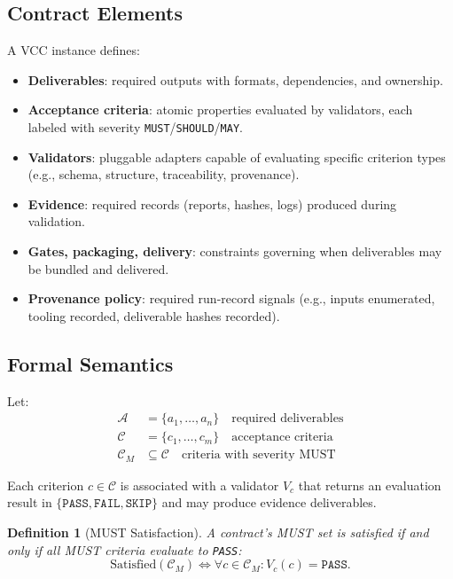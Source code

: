 \documentclass[11pt]{article}
\newtheorem{definition}{Definition}
\begin{document}
\subsection{Contract Elements}
A VCC instance defines:
\begin{itemize}[leftmargin=*]
  \item \textbf{Deliverables}: required outputs with formats, dependencies, and ownership.
  \item \textbf{Acceptance criteria}: atomic properties evaluated by validators, each labeled with severity \texttt{MUST}/\texttt{SHOULD}/\texttt{MAY}.
  \item \textbf{Validators}: pluggable adapters capable of evaluating specific criterion types (e.g., schema, structure, traceability, provenance).
  \item \textbf{Evidence}: required records (reports, hashes, logs) produced during validation.
  \item \textbf{Gates, packaging, delivery}: constraints governing when deliverables may be bundled and delivered.
  \item \textbf{Provenance policy}: required run-record signals (e.g., inputs enumerated, tooling recorded, deliverable hashes recorded).
\end{itemize}

\subsection{Formal Semantics}
Let:
\begin{align}
  \mathcal{A} &= \{a_1,\dots,a_n\} \quad \text{required deliverables} \\
  \mathcal{C} &= \{c_1,\dots,c_m\} \quad \text{acceptance criteria} \\
  \mathcal{C}_M &\subseteq \mathcal{C} \quad \text{criteria with severity MUST}
\end{align}

Each criterion $c \in \mathcal{C}$ is associated with a validator $V_c$ that returns an evaluation result in $\{\texttt{PASS}, \texttt{FAIL}, \texttt{SKIP}\}$ and may produce evidence deliverables.

\begin{definition}[MUST Satisfaction]
A contract's MUST set is satisfied if and only if all MUST criteria evaluate to \texttt{PASS}:
\[
\mathrm{Satisfied}(\mathcal{C}_M) \iff \forall c \in \mathcal{C}_M: V_c(c)=\texttt{PASS}.
\]
\end{definition}
\end{document}
